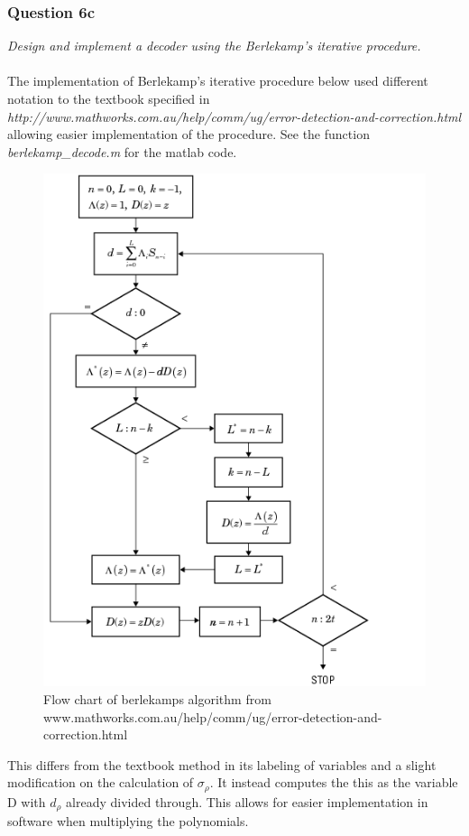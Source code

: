 \documentclass[a4paper]{article}
\begin{document}
\subsubsection{Question 6c} \textit{Design and implement a decoder using the Berlekamp’s iterative procedure.}\\
\\
The implementation of Berlekamp's iterative procedure below used different notation to the textbook specified in \textit{http://www.mathworks.com.au/help/comm/ug/error-detection-and-correction.html} allowing easier implementation of the procedure. See the function \textit{berlekamp\_decode.m} for the matlab code. 

\begin{figure}[H]
\centering
\includegraphics[scale=0.4]{berlekamp.png}
\caption{Flow chart of berlekamps algorithm from www.mathworks.com.au/help/comm/ug/error-detection-and-correction.html}
\end{figure}

This differs from the textbook method in its labeling of variables and a slight modification on the calculation of $\sigma_{\rho}$. It instead computes the this as the variable D with $d_{\rho}$ already divided through. This allows for easier implementation in software when multiplying the polynomials.
\end{document}
